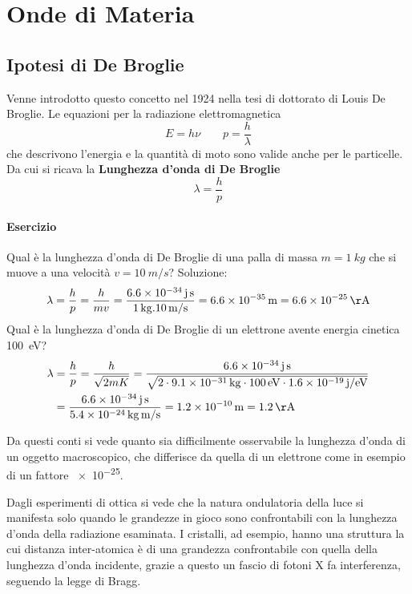 
\section{Onde di Materia}
\subsection{Ipotesi di De Broglie}
Venne introdotto questo concetto nel 1924 nella tesi di dottorato di Louis De Broglie.
Le equazioni per la radiazione elettromagnetica 
\begin{equation}
E = h\nu \quad \quad p = \frac{ h}{\lambda }
\end{equation}
che descrivono l'energia e la quantità di moto sono valide anche per le particelle.
Da cui si ricava la \textbf{Lunghezza d'onda di De Broglie}
\begin{equation}
\lambda = \frac{ h}{p }
\end{equation}

\paragraph{Esercizio}
Qual è la lunghezza d'onda di De Broglie di una palla di massa $ m =\SI{1}{kg}$ che si muove a una velocità $v = \SI{10}{m/s}$?
Soluzione:
\begin{equation}
\lambda = \frac{ h}{p } = \frac{ h}{m v } = \frac{ \SI{6.6e-34}{j.s}}{\SI{1}{kg} . \SI{10}{m/s} } = \SI{6.6e-35}{m} = \SI{6.6e-25}{\AA}
\end{equation}
Qual è la lunghezza d'onda di De Broglie di un elettrone avente energia cinetica \SI{100}{eV}?
\begin{equation}
\begin{split}
\lambda & = \frac{ h}{p } = \frac{ h}{\sqrt{2mK} } 
= \frac{\SI{6.6e-34}{j.s} }{\sqrt{ 2 \cdot \SI{9.1e-31}{kg} \cdot \SI{100}{eV} \cdot \SI{1.6e-19}{j / eV} } } \\
& = \frac{ \SI{6.6e-34}{j.s}}{\SI{5.4e-24}{kg.m/s} } = \SI{1.2e-10}{m} = \SI{1.2}{\AA}
\end{split}
\end{equation}

Da questi conti si vede quanto sia difficilmente osservabile la lunghezza d'onda di un oggetto macroscopico, che differisce da quella di un elettrone come in esempio di un fattore \SI{e-25}{}. 

Dagli esperimenti di ottica si vede che la natura ondulatoria della luce si manifesta solo quando le grandezze in gioco sono confrontabili con la lunghezza d'onda della radiazione esaminata.
I cristalli, ad esempio, hanno una struttura la cui distanza inter-atomica è di una grandezza confrontabile con quella della lunghezza d'onda incidente, grazie a questo un fascio di fotoni X fa interferenza, seguendo la legge di Bragg.

